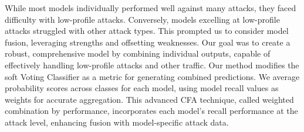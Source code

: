 
While most models individually performed well against many attacks, they faced difficulty with low-profile attacks. Conversely, models excelling at low-profile attacks struggled with other attack types. This prompted us to consider model fusion, leveraging strengths and offsetting weaknesses. Our goal was to create a robust, comprehensive model by combining individual outputs, capable of effectively handling low-profile attacks and other traffic. Our method modifies the soft Voting Classifier as a metric for generating combined predictions. We average probability scores across classes for each model, using model recall values as weights for accurate aggregation. This advanced CFA technique, called weighted combination by performance, incorporates each model's recall performance at the attack level, enhancing fusion with model-specific attack data.

